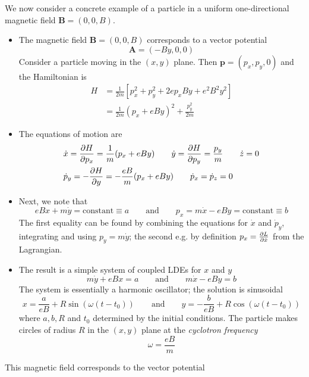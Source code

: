 \documentclass[11pt, a4paper]{article}
\newcommand{\eqtext}[1]{\qquad \text{#1} \qquad}
\begin{document}
We now consider a concrete example of a particle in a uniform one-directional magnetic field $ \bm{B} = (0, 0, B) $.
\begin{itemize}
	\item The magnetic field $ \bm{B} = (0, 0, B) $ corresponds to a vector potential
	\begin{equation*}
		\bm{A} = (-By, 0, 0)
	\end{equation*}
	Consider a particle moving in the $ (x,y) $ plane. Then $ \bm{p} = (p_{x}, p_{y}, 0) $ and the Hamiltonian is
	\begin{align*}
		H &= \frac{1}{2m}\left[p_{x}^{2} + p_{y}^{2} + 2ep_{x}B y + e^{2}B^{2}y^{2}\right]\\
		&=\frac{1}{2m}(p_{x} + e By)^{2} + \frac{p_{y}^{2}}{2m}
	\end{align*}
	
	\item The equations of motion are
	\begin{align*}
		&\dot{x} = \pdv{H}{p_{x}} = \frac{1}{m} (p_{x} + e By) \qquad \dot{y} = \pdv{H}{p_{y}} = \frac{p_{y}}{m} \qquad \dot{z} = 0\\
		&\dot{p}_{y} = - \pdv{H}{y} = -\frac{eB}{m}(p_{x} + eBy) \qquad \dot{p}_{x} = \dot{p}_{z} = 0
	\end{align*}
	
	\item Next, we note that
	\begin{equation*}
		eBx + m\dot{y} = \text{constant} \equiv a  \eqtext{and}
		p_{x} = m\dot{x} - eBy = \text{constant} \equiv b
	\end{equation*}
	The first equality can be found by combining the equations for $ \dot{x} $ and $ \dot{p}_{y} $, integrating and using $ p_{y} = m \dot{y} $; the second e.g. by definition $ p_{x} = \pdv{L}{\dot{x}} $ from the Lagrangian. 
	
	\item The result is a simple system of coupled LDEs for $ x $ and $ y $
	\begin{equation*}
		m\dot{y} + eBx = a \eqtext{and} m\dot{x} - eBy = b
	\end{equation*}
	The system is essentially a harmonic oscillator; the solution is sinusoidal
	\begin{equation*}
		x = \frac{a}{eB} + R \sin (\omega(t - t_{0})) \eqtext{and} y = -\frac{b}{eB} + R \cos (\omega(t - t_{0}))
	\end{equation*}
	where $ a, b, R $ and $ t_{0} $ determined by the initial conditions. The particle makes circles of radius $ R $ in the $ (x, y) $ plane at the \textit{cyclotron frequency}
	\begin{equation*}
	 	\omega = \frac{eB}{m}
	\end{equation*}
\end{itemize}
 This magnetic field corresponds to the vector potential 
\end{document}
